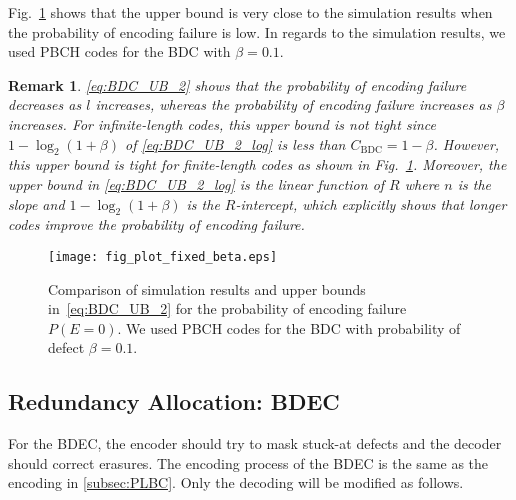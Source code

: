 \documentclass[10pt,twocolumn,twoside,submit]{JCNtran}
\newtheorem{remark}[theorem]{Remark}
\begin{document}
	Fig.~\ref{fig:plot_fixed_beta} shows that the upper bound is very close to the simulation results when the probability of encoding failure is low. In regards to the simulation results, we used PBCH codes for the BDC with $\beta = 0.1$.%
	
	\begin{remark}
	\eqref{eq:BDC_UB_2} shows that the probability of encoding failure decreases as $l$ increases, whereas the probability of encoding failure increases as $\beta$ increases. For infinite-length codes, this upper bound is not tight since $1 - \log_2(1 + \beta)$ of \eqref{eq:BDC_UB_2_log} is less than $C_{\text{BDC}} = 1 - \beta$. However, this upper bound is tight for finite-length codes as shown in Fig.~\ref{fig:plot_fixed_beta}. Moreover, the upper bound in \eqref{eq:BDC_UB_2_log} is the linear function of $R$ where $n$ is the slope and $1 - \log_2(1 + \beta)$ is the $R$-intercept, which explicitly shows that longer codes improve the probability of encoding failure.   
	\end{remark}
	
	\begin{figure}[!t]
		\centering
		\texttt{[image: fig\_plot\_fixed\_beta.eps]}
		\caption{Comparison of simulation results and upper bounds in~\eqref{eq:BDC_UB_2} for the probability of encoding failure $P(E=0)$. We used PBCH codes for the BDC with probability of defect $\beta=0.1$.}
		\label{fig:plot_fixed_beta}
		\vspace{-2mm}
	\end{figure}
		

	\subsection{Redundancy Allocation: BDEC} \label{sec:BDEC_ra}

	For the BDEC, the encoder should try to mask stuck-at defects and the decoder should correct erasures. The encoding process of the BDEC is the same as the encoding in \ref{subsec:PLBC}. Only the decoding will be modified as follows. 
	
\end{document}

